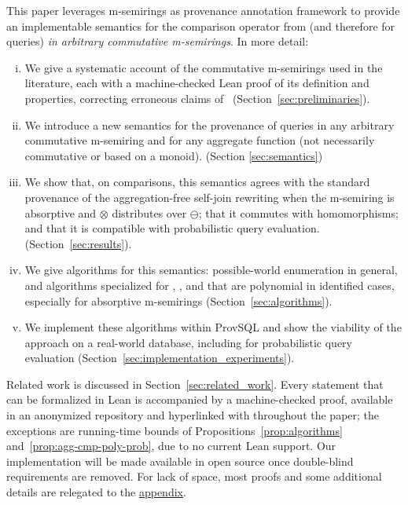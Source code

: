 This paper leverages m-semirings as provenance annotation framework to provide
an implementable semantics for the comparison operator from
\cite{amsterdamer2011provenance} (and therefore for 
queries) \emph{in arbitrary commutative
m-semirings}. In more detail:
\begin{enumerate}[(i)]
\item We give a systematic account of the commutative m-semirings used
  in the literature, each with a machine-checked Lean proof of its
  definition and properties, correcting erroneous claims
  of~\cite{geerts2010database,amsterdamer2011limitations}
  (Section~\ref{sec:preliminaries}).

  \item We introduce a new semantics for the provenance of  queries
  in any
  arbitrary commutative m-semiring and for any aggregate
  function (not necessarily commutative or based on a monoid). (Section
  \ref{sec:semantics})

\item We show that, on  comparisons, this semantics
  agrees with the standard provenance of the aggregation-free self-join
  rewriting when the m-semiring is absorptive and $\otimes$ distributes
  over $\ominus$; that it commutes with homomorphisms; and that it is
  compatible with probabilistic query evaluation.
  (Section~\ref{sec:results}).

\item We give algorithms for this semantics: possible-world enumeration
  in general, and algorithms specialized for , ,
   and  that are polynomial in identified cases,
  especially for absorptive m-semirings (Section~\ref{sec:algorithms}).

\item We implement these algorithms within ProvSQL and show
  the viability of the approach on a real-world database,
  including for probabilistic query evaluation
  (Section~\ref{sec:implementation_experiments}).
\end{enumerate}

Related work is discussed in Section~\ref{sec:related_work}.
Every statement that can be formalized in Lean is accompanied by a
machine-checked proof, available in an anonymized repository and
hyperlinked with \leanmain{} throughout the paper; the exceptions are
running-time bounds of Propositions~\ref{prop:algorithms}
and~\ref{prop:agg-cmp-poly-prob}, due to no current Lean support.
Our implementation
will be made available in open source
once double-blind requirements are removed. For lack of space,
most proofs and some additional details are relegated to the
\hyperref[appendix]{appendix}.
